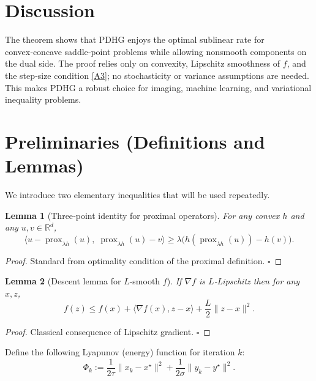 \documentclass{article}
\newtheorem{lemma}{Lemma}
\begin{document}
\section*{Discussion}
The theorem shows that PDHG enjoys the optimal sublinear rate for convex‑concave saddle‑point problems while allowing nonsmooth components on the dual side. The proof relies only on convexity, Lipschitz smoothness of $f$, and the step‑size condition \eqref{A3}; no stochasticity or variance assumptions are needed. This makes PDHG a robust choice for imaging, machine learning, and variational inequality problems.

\section*{Preliminaries (Definitions and Lemmas)}
We introduce two elementary inequalities that will be used repeatedly.

\begin{lemma}[Three‑point identity for proximal operators]\label{lem:three-point}
For any convex $h$ and any $u,v\in\mathbb{R}^{d}$,
\[
\langle u-\operatorname{prox}_{\lambda h}(u),\; \operatorname{prox}_{\lambda h}(u)-v\rangle
\ge
\lambda\bigl( h(\operatorname{prox}_{\lambda h}(u))-h(v)\bigr).
\tag{L1}
\]
\end{lemma}
\begin{proof}
Standard from optimality condition of the proximal definition. \hfill $\square$
\end{proof}

\begin{lemma}[Descent lemma for $L$‑smooth $f$]\label{lem:descent}
If $\nabla f$ is $L$‑Lipschitz then for any $x,z$,
\[
f(z)\le f(x)+\langle\nabla f(x),z-x\rangle+\frac{L}{2}\|z-x\|^{2}.
\tag{L2}
\]
\end{lemma}
\begin{proof}
Classical consequence of Lipschitz gradient. \hfill $\square$
\end{proof}

Define the following Lyapunov (energy) function for iteration $k$:
\[
\Phi_{k}:=
\frac{1}{2\tau}\|x_{k}-x^{\star}\|^{2}
+\frac{1}{2\sigma}\|y_{k}-y^{\star}\|^{2}.
\tag{7}
\]

\end{document}
